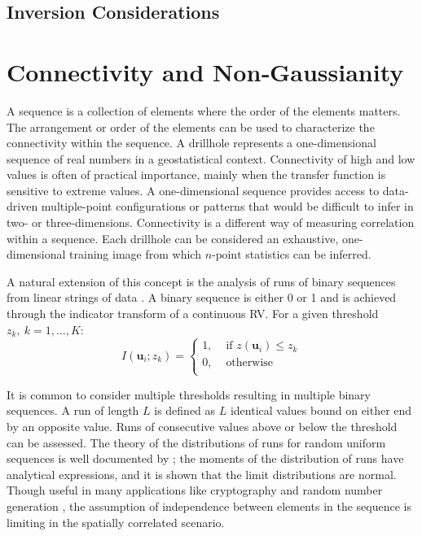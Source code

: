 \subsection{Inversion Considerations}
\label{subsec:03invconsider}


\FloatBarrier
\section{Connectivity and Non‐Gaussianity}
\label{sec:03connect}

A sequence is a collection of elements where the order of the elements matters. The arrangement or order of the elements can be used to characterize the connectivity within the sequence. A drillhole represents a one-dimensional sequence of real numbers in a geostatistical context. Connectivity of high and low values is often of practical importance, mainly when the transfer function is sensitive to extreme values. A one-dimensional sequence provides access to data-driven multiple-point configurations or patterns that would be difficult to infer in two- or three-dimensions. Connectivity is a different way of measuring correlation within a sequence. Each drillhole can be considered an exhaustive, one-dimensional training image from which $n\text{-point}$ statistics can be inferred.

A natural extension of this concept is the analysis of runs of binary sequences from linear strings of data \citep{ortiz2003characterization}. A binary sequence is either 0 or 1 and is achieved through the indicator transform of a continuous \gls{RV}. For a given threshold $z_{k}, \ k=1,\dots,K$:
\begin{equation}
    I(\mathbf{u}_{i};z_{k}) =
    \begin{cases}
        1, & \text{ if }z(\mathbf{u}_{i}) \leq z_{k} \\
        0, & \text{ otherwise }                      \\
    \end{cases}
    \label{eq:indicator}
\end{equation}

It is common to consider multiple thresholds resulting in multiple binary sequences. A run of length $L$ is defined as $L$ identical values bound on either end by an opposite value. Runs of consecutive values above or below the threshold can be assessed. The theory of the distributions of runs for random uniform sequences is well documented by \cite{mood1940distribution}; the moments of the distribution of runs have analytical expressions, and it is shown that the limit distributions are normal. Though useful in many applications like cryptography and random number generation \citep{rukhin2010statistical}, the assumption of independence between elements in the sequence is limiting in the spatially correlated scenario.

